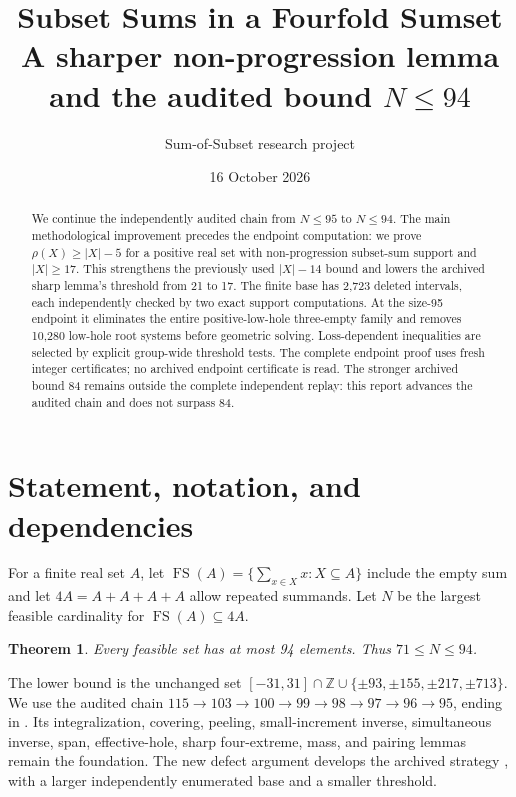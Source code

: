 \documentclass[11pt,a4paper]{article}
\title{Subset Sums in a Fourfold Sumset\\\large A sharper non-progression lemma and the audited bound $N\le94$}
\author{Sum-of-Subset research project}
\date{16 October 2026}
\newcommand{\FS}{\operatorname{FS}}
\newcommand{\Z}{\mathbb Z}
\newtheorem{theorem}{Theorem}[section]
\begin{document}
\maketitle
\begin{abstract}
We continue the independently audited chain from $N\le95$ to $N\le94$.
The main methodological improvement precedes the endpoint computation:
we prove $\rho(X)\ge |X|-5$ for a positive real set with non-progression
subset-sum support and $|X|\ge17$. This strengthens the previously used
$|X|-14$ bound and lowers the archived sharp lemma's threshold from 21
to 17. The finite base has 2,723 deleted intervals, each independently
checked by two exact support computations. At the size-95 endpoint it
eliminates the entire positive-low-hole three-empty family and removes
10,280 low-hole root systems before geometric solving.
Loss-dependent inequalities are selected by explicit group-wide
threshold tests. The complete endpoint proof uses fresh integer
certificates; no archived endpoint certificate is read.
The stronger archived bound 84 remains outside the complete independent
replay: this report advances the audited chain and does not surpass 84.
\end{abstract}

\section{Statement, notation, and dependencies}
For a finite real set $A$, let
$\FS(A)=\{\sum_{x\in X}x:X\subseteq A\}$ include the empty sum and let
$4A=A+A+A+A$ allow repeated summands. Let $N$ be the largest feasible
cardinality for $\FS(A)\subseteq4A$.
\begin{theorem}\label{main}
Every feasible set has at most 94 elements. Thus $71\le N\le94$.
\end{theorem}
The lower bound is the unchanged set
$[-31,31]\cap\Z\cup\{\pm93,\pm155,\pm217,\pm713\}$.
We use the audited chain $115\to103\to100\to99\to98\to97\to96\to95$,
ending in \cite{previous}. Its integralization, covering, peeling,
small-increment inverse, simultaneous inverse, span, effective-hole,
sharp four-extreme, mass, and pairing lemmas remain the foundation.
The new defect argument develops the archived strategy \cite{archive},
with a larger independently enumerated base and a smaller threshold.
\end{document}
